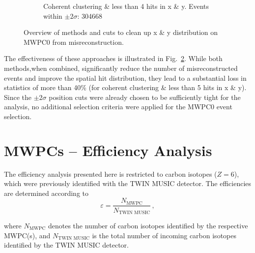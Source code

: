 \begin{appendices}
\begin{figure}
\begin{subfigure}{.45\textwidth}
  \caption{Coherent clustering \& less than 4 hits in x \& y. Events within $\pm2\sigma$\protect\footnotemark: 304668}
  \label{fig:sub-fourth}
\end{subfigure}
\caption{Overview of methods and cuts to clean up x \& y distribution on MWPC0 from misreconstruction.}
\label{fig:mw0_approaches}
\end{figure}
The effectiveness of these approaches is illustrated in Fig.~\ref{fig:mw0_approaches}. While both methods,when combined, significantly reduce the number of misreconstructed events and improve the spatial hit distribution, they lead to a substantial loss in statistics of more than 40\% (for coherent clustering \& less than 5 hits in x \& y).\newline
Since the $\pm2\sigma$ position cuts were already chosen to be sufficiently tight for the analysis, no additional selection criteria were applied for the MWPC0 event selection.

\clearpage


\section{MWPCs -- Efficiency Analysis}\label{app:mwpcs_eff}

The efficiency analysis presented here is restricted to carbon isotopes (\(Z = 6\)), which were previously identified with the TWIN MUSIC detector. The efficiencies are determined according to
\begin{equation}
\varepsilon = \frac{N_{\text{MWPC}}}{N_{\text{TWIN MUSIC}}} \, ,
\end{equation}

where \(N_{\text{MWPC}}\) denotes the number of carbon isotopes identified by the respective MWPC(s), and \(N_{\text{TWIN MUSIC}}\) is the total number of incoming carbon isotopes identified by the TWIN MUSIC detector.  


\end{appendices}
